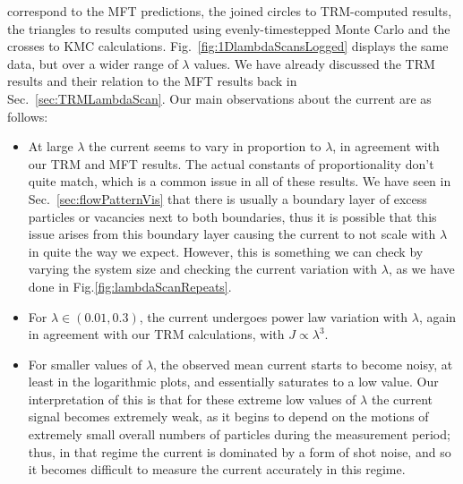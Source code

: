 correspond to the MFT predictions, the joined circles to TRM-computed results, the triangles to results
computed using evenly-timestepped Monte Carlo and the crosses to KMC calculations.
Fig.~\ref{fig:1DlambdaScansLogged} displays the same data, but over a wider range of $\lambda$ values.
We have already discussed the TRM results and their relation to the MFT results back in 
Sec.~\ref{sec:TRMLambdaScan}. Our main observations about the current are as follows:
\begin{itemize}
 \item At large $\lambda$ the current seems to vary in proportion to $\lambda$, in agreement with our
 TRM and MFT results. The actual constants of proportionality don't quite match, which is a common issue
 in all of these results. We have seen in Sec.~\ref{sec:flowPatternVis} that there is usually a boundary
 layer of excess particles or vacancies next to both boundaries, thus it is possible that this issue
 arises from this boundary layer causing the current to not scale with $\lambda$ in quite the way we
 expect. However, this is something we can check by varying the system size and checking the current
 variation with $\lambda$, as we have done in Fig.\ref{fig:lambdaScanRepeats}.
 \item For $\lambda \in (0.01, 0.3)$, the current undergoes power law variation with $\lambda$, again in 
 agreement with our TRM calculations, with $J \propto \lambda^{3}$.
 \item For smaller values of $\lambda$, the observed mean current starts to become noisy, at least in the
 logarithmic plots, and essentially saturates to a low value. Our interpretation of this is that for these
 extreme low values of $\lambda$ the current signal becomes extremely weak, as it begins to depend on the
 motions of extremely small overall numbers of particles during the measurement period; thus, in that 
 regime the current is dominated by a form of shot noise, and so it becomes difficult to measure the current accurately in this regime.
\end{itemize}

